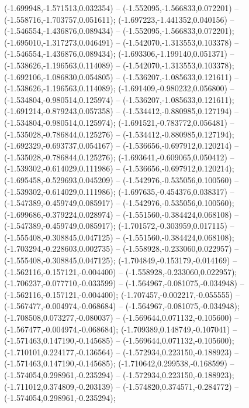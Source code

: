  (-1.699948,-1.571513,0.032354) -- (-1.552095,-1.566833,0.072201) -- (-1.558716,-1.703757,0.051611);
 (-1.697223,-1.441352,0.040156) -- (-1.546554,-1.436876,0.089434) -- (-1.552095,-1.566833,0.072201);
 (-1.695010,-1.317273,0.046491) -- (-1.542070,-1.313553,0.103378) -- (-1.546554,-1.436876,0.089434);
 (-1.693306,-1.199140,0.051371) -- (-1.538626,-1.196563,0.114089) -- (-1.542070,-1.313553,0.103378);
 (-1.692106,-1.086830,0.054805) -- (-1.536207,-1.085633,0.121611) -- (-1.538626,-1.196563,0.114089);
 (-1.691409,-0.980232,0.056800) -- (-1.534804,-0.980514,0.125974) -- (-1.536207,-1.085633,0.121611);
 (-1.691214,-0.879243,0.057358) -- (-1.534412,-0.880985,0.127194) -- (-1.534804,-0.980514,0.125974);
 (-1.691521,-0.783772,0.056481) -- (-1.535028,-0.786844,0.125276) -- (-1.534412,-0.880985,0.127194);
 (-1.692329,-0.693737,0.054167) -- (-1.536656,-0.697912,0.120214) -- (-1.535028,-0.786844,0.125276);
 (-1.693641,-0.609065,0.050412) -- (-1.539302,-0.614029,0.111986) -- (-1.536656,-0.697912,0.120214);
 (-1.695458,-0.529693,0.045209) -- (-1.542976,-0.535056,0.100560) -- (-1.539302,-0.614029,0.111986);
 (-1.697635,-0.454376,0.038317) -- (-1.547389,-0.459749,0.085917) -- (-1.542976,-0.535056,0.100560);
 (-1.699686,-0.379224,0.028974) -- (-1.551560,-0.384424,0.068108) -- (-1.547389,-0.459749,0.085917);
 (-1.701572,-0.303959,0.017115) -- (-1.555408,-0.308845,0.047125) -- (-1.551560,-0.384424,0.068108);
 (-1.703294,-0.228603,0.002735) -- (-1.558928,-0.233060,0.022957) -- (-1.555408,-0.308845,0.047125);
 (-1.704849,-0.153179,-0.014169) -- (-1.562116,-0.157121,-0.004400) -- (-1.558928,-0.233060,0.022957);
 (-1.706237,-0.077710,-0.033599) -- (-1.564967,-0.081075,-0.034948) -- (-1.562116,-0.157121,-0.004400);
 (-1.707457,-0.002217,-0.055555) -- (-1.567477,-0.004974,-0.068684) -- (-1.564967,-0.081075,-0.034948);
 (-1.708508,0.073277,-0.080037) -- (-1.569644,0.071132,-0.105600) -- (-1.567477,-0.004974,-0.068684);
 (-1.709389,0.148749,-0.107041) -- (-1.571463,0.147190,-0.145685) -- (-1.569644,0.071132,-0.105600);
 (-1.710101,0.224177,-0.136564) -- (-1.572934,0.223150,-0.188923) -- (-1.571463,0.147190,-0.145685);
 (-1.710642,0.299538,-0.168599) -- (-1.574054,0.298961,-0.235294) -- (-1.572934,0.223150,-0.188923);
 (-1.711012,0.374809,-0.203139) -- (-1.574820,0.374571,-0.284772) -- (-1.574054,0.298961,-0.235294);
